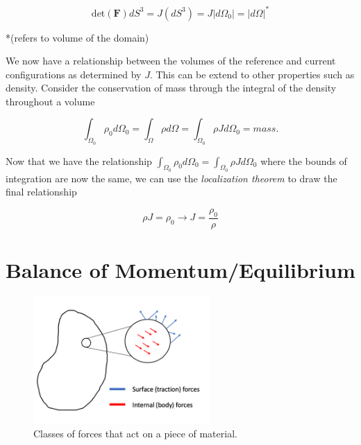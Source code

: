 \documentclass[a4paper]{article}
\begin{document}
\begin{equation}
    \text{det}(\mathbf{F}) dS^3 = J (dS^3) = J |d\Omega_0| = |d\Omega|^*
\end{equation}

*(refers to volume of the domain)


We now have a relationship between the volumes of the reference and current configurations as determined by $J$. This can be extend to other properties such as density. Consider the conservation of mass through the integral of the density throughout a volume

\begin{equation}
    \int_{\Omega_0} \rho_0 d\Omega_0 = \int_{\Omega} \rho d\Omega = \int_{\Omega_0} \rho J d\Omega_0 = mass. 
\end{equation}

Now that we have the relationship $\int_{\Omega_0} \rho_0 d\Omega_0 = \int_{\Omega_0} \rho J d\Omega_0$ where the bounds of integration are now the same, we can use the \textit{localization theorem} to draw the final relationship 

\begin{equation}\label{eqn:40}
    \boxed{\rho J = \rho_0 \rightarrow J = \frac{\rho_0}{\rho}}
\end{equation}

\section{Balance of Momentum/Equilibrium}

\begin{figure}[ht!]
    \centering
    \includegraphics[width=0.6\textwidth]{traction_body_forces.png}
    \caption{Classes of forces that act on a piece of material.}
    \label{fig:forces}
\end{figure}
\FloatBarrier
\end{document}
